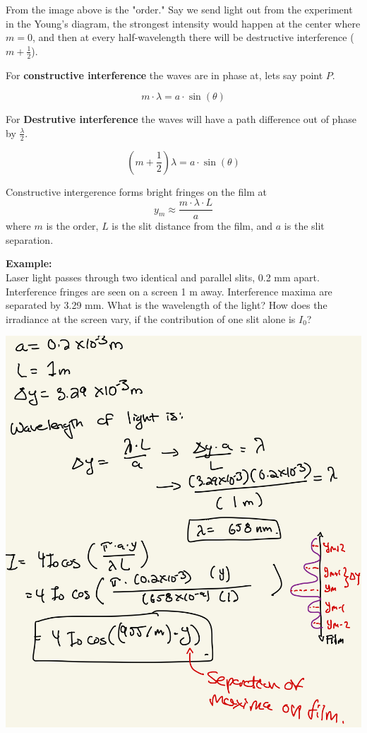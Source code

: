 \documentclass[10pt]{article}
\begin{document}
From the image above is the "order." Say we send light out from the experiment in the Young's diagram, the strongest intensity would happen at the center where $m=0$, and then at every half-wavelength there will be destructive interference ($m + \frac{1}{2}$).

\newblock

For \textbf{constructive interference} the waves are in phase at, lets say point $P$.

\[m \cdot \lambda = a \cdot \sin(\theta)\]

For \textbf{Destrutive interference} the waves will have a path difference out of phase by $\frac{\lambda}{2}$.

\[(m + \frac{1}{2})\lambda = a \cdot \sin(\theta)\]

\newpage

Constructive intergerence forms bright fringes on the film at
\[y_m \approx \frac{m \cdot \lambda \cdot L}{a}\]
where $m$ is the order, $L$ is the slit distance from the film, and $a$ is the slit separation.

\newblock

\textbf{Example:} \\ 
Laser light passes through two identical and parallel slits, 0.2 mm apart. Interference fringes are seen on a screen 1 m away. Interference maxima are
separated by 3.29 mm. What is the wavelength of the light? How does the irradiance at the screen vary, if the contribution of one slit alone is $I_0$?

\begin{center}
    \includegraphics*[scale = .2]{imgs/double-split-example.jpeg}
\end{center}
\end{document}
